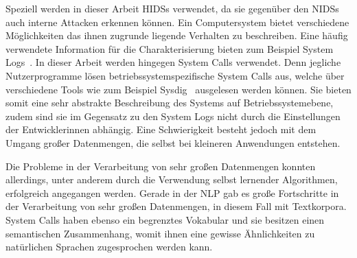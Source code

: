 
%


Speziell werden in dieser Arbeit \acp{HIDS} verwendet, da sie gegenüber den \acp{NIDS} auch interne Attacken erkennen können.
Ein Computersystem bietet verschiedene Möglichkeiten das ihnen zugrunde liegende Verhalten zu beschreiben.
Eine häufig verwendete Information für die Charakterisierung bieten zum Beispiel System Logs~\cite{HE}.
In dieser Arbeit werden hingegen System Calls verwendet.
Denn jegliche Nutzerprogramme lösen betriebssystemspezifische System Calls aus, welche über verschiedene Tools wie zum Beispiel Sysdig~\cite{SYSDIG} ausgelesen werden können.
Sie bieten somit eine sehr abstrakte Beschreibung des Systems auf Betriebssystemebene, zudem sind sie im Gegensatz zu den System Logs nicht durch die Einstellungen der Entwicklerinnen abhängig.
Eine Schwierigkeit besteht jedoch mit dem Umgang großer Datenmengen, die selbst bei kleineren Anwendungen entstehen.

Die Probleme in der Verarbeitung von sehr großen Datenmengen konnten allerdings, unter anderem durch die Verwendung selbst lernender Algorithmen, erfolgreich angegangen werden.
Gerade in der \ac{NLP} gab es große Fortschritte in der Verarbeitung von sehr großen Datenmengen, in diesem Fall mit Textkorpora.
System Calls haben ebenso ein begrenztes Vokabular und sie besitzen einen semantischen Zusammenhang, womit ihnen eine gewisse Ähnlichkeiten zu natürlichen Sprachen zugesprochen werden kann.

